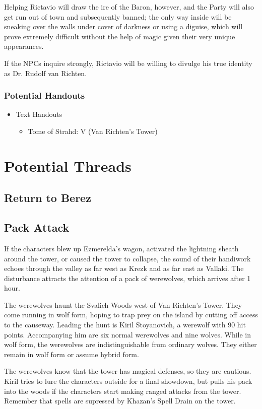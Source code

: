 \documentclass[a4paper,11pt]{article}
\begin{document}
Helping Rictavio will draw the ire of the Baron, however, and the Party will also get run out of town and
subsequently banned; the only way inside will be sneaking over the walls under cover of darkness or using a 
diguise, which will prove extremely difficult without the help of magic given their very unique appearances.

If the NPCs inquire strongly, Rictavio will be willing to divulge his true identity as Dr. Rudolf van Richten.
\subsubsection{Potential Handouts}
\begin{itemize}
  \item Text Handouts
  \begin{itemize}
    \item Tome of Strahd: V (Van Richten's Tower)
  \end{itemize}
\end{itemize}

\section{Potential Threads}
\label{sec:PotentialThreads}
\subsection{Return to Berez}

\subsection{Pack Attack}
If the characters blew up Ezmerelda's wagon, activated the lightning sheath around the tower, or caused the tower 
to collapse, the sound of their handiwork echoes through the valley as far west as Krezk and as far east as 
Vallaki. The disturbance attracts the attention of a pack of werewolves, which arrives after 1 hour.

The werewolves haunt the Svalich Woods west of Van Richten's Tower. They come running in wolf form, hoping to trap 
prey on the island by cutting off access to the causeway. Leading the hunt is Kiril Stoyanovich, a werewolf with 90 
hit points. Accompanying him are six normal werewolves and nine wolves. While in wolf form, the werewolves are 
indistinguishable from ordinary wolves. They either remain in wolf form or assume hybrid form.

The werewolves know that the tower has magical defenses, so they are cautious. Kiril tries to lure the characters 
outside for a final showdown, but pulls his pack into the woods if the characters start making ranged attacks from 
the tower. Remember that spells are supressed by Khazan's Spell Drain on the tower.
\end{document}
